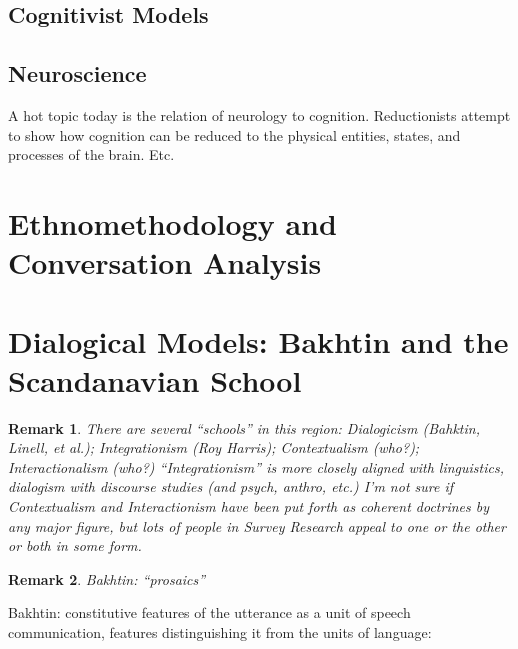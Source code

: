 \documentclass[11pt,twoside]{article}
\newtheorem{remark}{Remark}
\newcommand{\SR}{Survey Research}
\begin{document}
\subsection{Cognitivist Models}

\cite{levinson_cognition_2006}

\subsection{Neuroscience}

A hot topic today is the relation of neurology to cognition.
Reductionists attempt to show how cognition can be reduced to the
physical entities, states, and processes of the brain.  Etc.

\section{Ethnomethodology and Conversation Analysis}

\begin{abstract}

\end{abstract}

\section{Dialogical Models: Bakhtin and the Scandanavian School}

\begin{remark}
  There are several ``schools'' in this region: Dialogicism (Bahktin,
  Linell, et al.); Integrationism (Roy Harris); Contextualism (who?);
  Interactionalism (who?)  ``Integrationism'' is more closely aligned
  with linguistics, dialogism with discourse studies (and psych,
  anthro, etc.)  I'm not sure if Contextualism and Interactionism have
  been put forth as coherent doctrines by any major figure, but lots
  of people in \SR{} appeal to one or the other or both in some form.
\end{remark}

\begin{abstract}

\end{abstract}

\begin{remark}
  Bakhtin: ``prosaics''
\end{remark}

Bakhtin: constitutive features of the utterance as a unit of speech
communication, features distinguishing it from the units of language:
\end{document}
